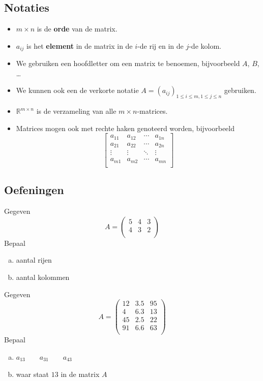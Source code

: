 \documentclass[12pt,twoside]{article}
\begin{document}
\subsection{Notaties}
\begin{itemize}
\item $m \times n$ is de {\bf orde} van de matrix.
\item $a_{ij}$ is het {\bf element} in de matrix in de $i$-de rij en in de $j$-de kolom.
\item We gebruiken een hoofdletter om een matrix te benoemen, bijvoorbeeld $A$, $B$, \ldots
\item We kunnen ook een de verkorte notatie $A=(a_{ij})_{1 \leq i \leq m , 1 \leq j \leq n}$ gebruiken.
\item $\mathbb{R}^{m \times n}$ is de verzameling van alle $m \times n$-matrices.
\item Matrices mogen ook met rechte haken genoteerd worden, bijvoorbeeld
$$
\begin{bmatrix}
  a_{11} & a_{12} & \cdots & a_{1n} \\
  a_{21} & a_{22} & \cdots & a_{2n} \\
  \vdots      & \vdots      & \ddots & \vdots      \\
  a_{m1} & a_{m2} & \cdots & a_{mn} \\
\end{bmatrix}
$$
\end{itemize}

\subsection{Oefeningen}

\begin{oefening}
Gegeven
$$A=\begin{pmatrix}
5 & 4 & 3\\
4 & 3 & 2\\
\end{pmatrix}$$
Bepaal
\begin{enumerate}[(a)]
  \item aantal rijen
  \item aantal kolommen
\end{enumerate}
\end{oefening}

\begin{oefening}
Gegeven
$$A=\begin{pmatrix}
12 & 3.5 & 95\\
4  & 6.3 & 13\\
45 & 2.5 & 22\\
91 & 6.6 & 63\\
\end{pmatrix}$$
Bepaal
\begin{enumerate}[(a)]
  \item $a_{13} \qquad a_{31} \qquad a_{43}$
  \item waar staat $13$ in de matrix $A$
\end{enumerate}
\end{oefening}
\end{document}
